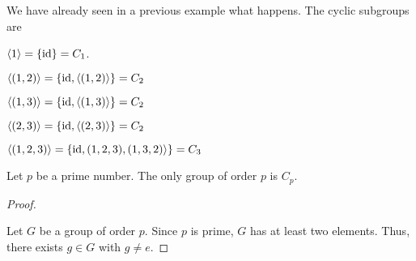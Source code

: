 \begin{example}
    We have already seen in a previous example what happens. The cyclic subgroups are

    \begin{listu}
        \item $\langle 1 \rangle = \{ \mathrm{id} \} = C_1$.
        \item $\langle (1, 2) \rangle = \{ \mathrm{id}, \langle (1, 2) \rangle \} = C_2$
        \item $\langle (1, 3) \rangle = \{ \mathrm{id}, \langle (1, 3) \rangle \} = C_2$
        \item $\langle (2, 3) \rangle = \{ \mathrm{id}, \langle (2, 3) \rangle \} = C_2$
        \item $\langle (1, 2, 3) \rangle = \{ \mathrm{id}, (1, 2, 3), (1, 3, 2) \rangle \} = C_3$
    \end{listu}
\end{example}

\begin{proposition}
    Let $p$ be a prime number. The only group of order $p$ is $C_p$. 
\end{proposition}

\begin{proof}
    {~~~}

    Let $G$ be a group of order $p$. Since $p$ is prime, $G$ has at least two elements. Thus, there exists $g \in G$ with $g \neq e$. 

\end{proof}